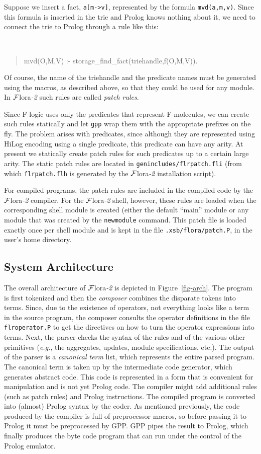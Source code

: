 \documentclass[11pt]{article}
\newcommand{\FLORA}{{\mbox{\sc ${\cal F}${lora}\rm\emph{-2}}}\xspace}
\newcommand{\fl}{\mbox{F-logic}\xspace}
\begin{document}
Suppose we insert a fact, {\tt a[m->v]}, represented by the formula
{\tt mvd(a,m,v)}. Since this formula is inserted in the trie and Prolog knows
nothing about it, we need to connect the trie to Prolog through a rule like
this:
{\tt
\begin{quote}
  mvd(O,M,V) :- storage\_find\_fact(triehandle,f(O,M,V)).
\end{quote}
}
Of course, the name of the triehandle and the predicate names must be
generated using the macros, as described above, so that they could be used
for any module. In \FLORA such rules are called \emph{patch rules}. 

Since \fl uses only the predicates that represent F-molecules, we can
create such rules statically and let {\tt gpp} wrap them with the
appropriate prefixes on the fly.  The problem arises with predicates, since
although they are represented using HiLog encoding using a single
predicate, this predicate can have any arity.  At present we statically
create patch rules for such predicates up to a certain large arity.  The
static patch rules are located in {\tt genincludes/flrpatch.fli} (from
which {\tt flrpatch.flh} is generated by the \FLORA installation script).

For compiled programs, the patch rules are included in the compiled code
by the \FLORA compiler. For the \FLORA shell, however, these rules are
loaded when the corresponding shell module is created (either the default
``main'' module or any module that was created by the {\tt newmodule}
command. This patch file is loaded exactly once per shell module and is
kept in the file {\tt .xsb/flora/patch.P}, in the user's home directory.


\subsection{System Architecture}

The overall architecture of \FLORA is depicted in Figure~\ref{fig-arch}.
The program is first tokenized and then the \emph{composer} combines the
disparate tokens into terms. Since, due to the existence of operators, not
everything looks like a term in the source program, the composer consults
the operator definitions in the file {\tt flroperator.P} to get the
directives on how to turn the operator expressions into terms. Next, the
parser checks the syntax of the rules and of the various other primitives
({\it e.g.}, the aggregates, updates, module specifications, etc.). The
output of the parser is a \emph{canonical term} list, which represents the
entire parsed program. The canonical term is taken up by the intermediate
code generator, which generates abstract code. This code is represented in
a form that is convenient for manipulation and is not yet Prolog code.  The
compiler might add additional rules (such as patch rules) and Prolog
instructions. The compiled program is converted into (almost) Prolog syntax
by the coder. As mentioned previously, the code produced by the compiler is
full of preprocessor macros, so before passing it to Prolog it must be
preprocessed by GPP. GPP pipes the result to Prolog, which finally produces
the byte code program that can run under the control of the Prolog
emulator.
\end{document}
